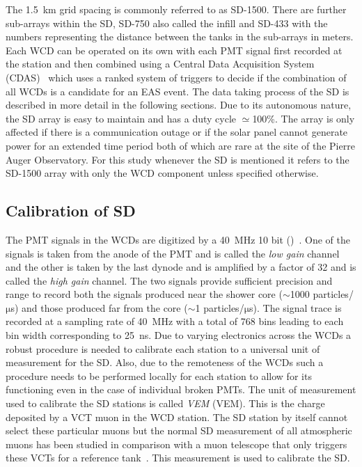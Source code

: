 The 1.5 km grid spacing is commonly referred to as SD-1500. There are further sub-arrays within the SD, SD-750 also called the infill and SD-433 with the numbers representing the distance between the tanks in the sub-arrays in meters. Each WCD can be operated on its own with each PMT signal first recorded at the station and then combined using a Central Data Acquisition System (CDAS)~\cite{Auger:2015} which uses a ranked system of triggers to decide if the combination of all WCDs is a candidate for an EAS event. The data taking process of the SD is described in more detail in the following sections. Due to its autonomous nature, the SD array is easy to maintain and has a duty cycle $\simeq$100\%. The array is only affected if there is a communication outage or if the solar panel cannot generate power for an extended time period both of which are rare at the site of the Pierre Auger Observatory. For this study whenever the SD is mentioned it refers to the SD-1500 array with only the WCD component unless specified otherwise.     

\subsection{Calibration of SD}
\label{sec:Sur_det_calib}

The PMT signals in the WCDs are digitized by a 40 MHz 10 bit \textit{} ()~\cite{PierreAuger:2005znw}. One of the signals is taken from the anode of the PMT and is called the \textit{low gain} channel and the other is taken by the last dynode and is amplified by a factor of 32 and is called the \textit{high gain} channel. The two signals provide sufficient precision and range to record both the signals produced near the shower core ($\sim$1000 particles/$\mathrm{\mu}$s) and those produced far from the core ($\sim$1 particles/$\mathrm{\mu}$s). The signal trace is recorded at a sampling rate of 40 MHz with a total of 768 bins leading to each bin width corresponding to 25 ns. Due to varying electronics across the WCDs a robust procedure is needed to calibrate each station to a universal unit of measurement for the SD. Also, due to the remoteness of the WCDs such a procedure needs to be performed locally for each station to allow for its functioning even in the case of individual broken PMTs. The unit of measurement used to calibrate the SD stations is called \textit{\acrlong{VEM}} (\acrshort{VEM}). This is the charge deposited by a \gls{VCT} muon in the WCD station. The SD station by itself cannot select these particular muons but the normal SD measurement of all atmospheric muons has been studied in comparison with a muon telescope that only triggers these VCTs for a reference tank~\cite{PierreAuger:2005cju}. This measurement is used to calibrate the SD.

